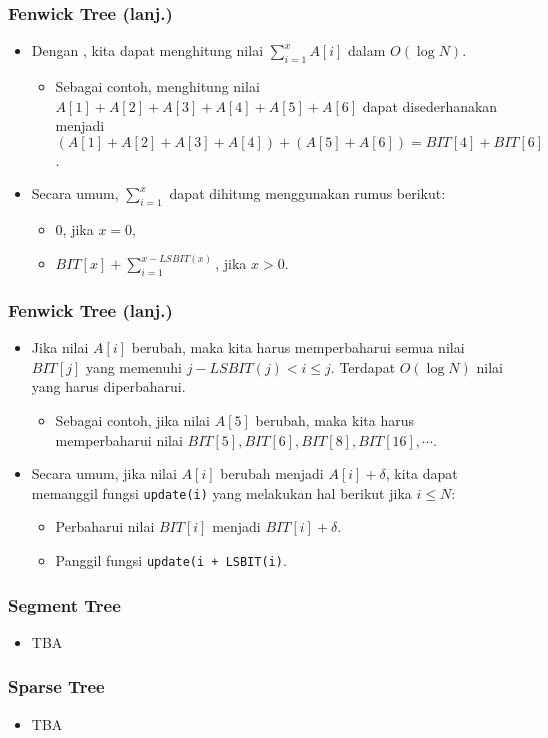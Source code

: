 \begin{frame}
\frametitle{Fenwick Tree (lanj.)}
\begin{itemize}
  \item Dengan \ffenwickTree, kita dapat menghitung nilai $\sum_{i=1}^{x} A[i]$ dalam $O(\log N)$.
  \begin{itemize}
    \item Sebagai contoh, menghitung nilai $A[1] + A[2] + A[3] + A[4] + A[5] + A[6]$ dapat disederhanakan menjadi $(A[1] + A[2] + A[3] + A[4]) + (A[5] + A[6]) = BIT[4] + BIT[6]$.
  \end{itemize}
  \item Secara umum, $\sum_{i=1}^{x}$ dapat dihitung menggunakan rumus berikut:
  \begin{itemize}
    \item $0$, jika $x = 0$,
    \item $BIT[x] + \sum_{i=1}^{x - LSBIT(x)}$, jika $x > 0$.
  \end{itemize}
\end{itemize}
\end{frame}

\begin{frame}
\frametitle{Fenwick Tree (lanj.)}
\begin{itemize}
  \item Jika nilai $A[i]$ berubah, maka kita harus memperbaharui semua nilai $BIT[j]$ yang memenuhi $j - LSBIT(j) < i \leq j$. Terdapat $O(\log N)$ nilai yang harus diperbaharui.
  \begin{itemize}
    \item Sebagai contoh, jika nilai $A[5]$ berubah, maka kita harus memperbaharui nilai $BIT[5], BIT[6], BIT[8], BIT[16], \cdots$.
  \end{itemize}
  \item Secara umum, jika nilai $A[i]$ berubah menjadi $A[i] + \delta$, kita dapat memanggil fungsi \lstinline{update(i)} yang melakukan hal berikut jika $i \leq N$:
  \begin{itemize}
    \item Perbaharui nilai $BIT[i]$ menjadi $BIT[i] + \delta$.
    \item Panggil fungsi \lstinline{update(i + LSBIT(i)}.
  \end{itemize}
\end{itemize}
\end{frame}

\begin{frame}
\frametitle{Segment Tree}
\begin{itemize}
  \item TBA
\end{itemize}
\end{frame}

\begin{frame}
\frametitle{Sparse Tree}
\begin{itemize}
  \item TBA
\end{itemize}
\end{frame}


